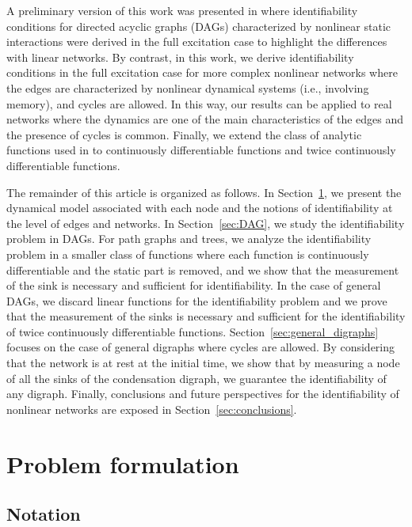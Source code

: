 \documentclass[letterpaper,10pt,journal]{IEEEtran}
\begin{document}
A preliminary version of this work was presented in \cite{vizuete2023nonlinear} where identifiability conditions for directed acyclic graphs (DAGs) characterized by nonlinear static interactions were derived in the full excitation case to highlight the differences with linear networks. By contrast, in this work, we derive identifiability conditions in the full excitation case for more complex nonlinear networks where the edges are characterized by nonlinear dynamical systems (i.e., involving memory), and cycles are allowed. In this way, our results can be applied to real networks where the dynamics are one of the main characteristics of the edges and the presence of cycles is common. Finally, we extend the class of analytic functions used in \cite{vizuete2023nonlinear} to continuously differentiable functions and twice continuously differentiable functions.


The remainder of this article is organized as follows.
In Section~\ref{sec:problem_formulation}, we present the dynamical model associated with each node and the notions of identifiability at the level of edges and networks. In Section~\ref{sec:DAG}, we study the identifiability problem in DAGs. For path graphs and trees, we analyze the identifiability problem in a smaller class of functions where each function is continuously differentiable and the static part is removed, and we show that the measurement of the sink is necessary and sufficient for identifiability. In the case of general DAGs, we discard linear functions for the identifiability problem and we prove that the measurement of the sinks is necessary and sufficient for the identifiability of twice continuously differentiable functions. Section~\ref{sec:general_digraphs} focuses on the case of general digraphs where cycles are allowed. By considering that the network is at rest at the initial time, we show that by measuring a node of all the sinks of the condensation digraph, we guarantee the identifiability of any digraph. 
Finally, conclusions and future perspectives for the identifiability of nonlinear networks are exposed in Section~\ref{sec:conclusions}.



\section{Problem formulation}\label{sec:problem_formulation}



\subsection{Notation}\label{sec:notation}
\end{document}
